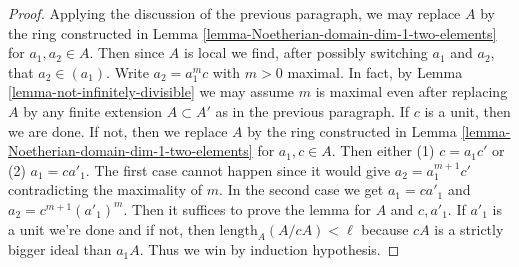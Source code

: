 \begin{proof}
\medskip\noindent
Applying the discussion of the previous paragraph,
we may replace $A$ by the ring constructed in
Lemma \ref{lemma-Noetherian-domain-dim-1-two-elements}
for $a_1, a_2 \in A$. Then since $A$ is local we find,
after possibly switching $a_1$ and $a_2$, that $a_2 \in (a_1)$.
Write $a_2 = a_1^m c$ with $m > 0$ maximal. In fact, by
Lemma \ref{lemma-not-infinitely-divisible}
we may assume $m$ is maximal even after replacing $A$
by any finite extension $A \subset A'$ as in the previous paragraph.
If $c$ is a unit, then we are done. If not, then we replace
$A$ by the ring constructed in
Lemma \ref{lemma-Noetherian-domain-dim-1-two-elements}
for $a_1, c \in A$. Then either (1) $c = a_1 c'$ or
(2) $a_1 = c a'_1$. The first case cannot happen since
it would give $a_2 = a_1^{m + 1} c'$ contradicting the
maximality of $m$. In the second case we get
$a_1 = c a'_1$ and $a_2 = c^{m + 1} (a'_1)^m$.
Then it suffices to prove the lemma for $A$ and $c, a'_1$.
If $a'_1$ is a unit we're done and if not, then
$\text{length}_A(A/cA) < \ell$ because $cA$ is a strictly
bigger ideal than $a_1A$. Thus we win by induction hypothesis.
\end{proof}






